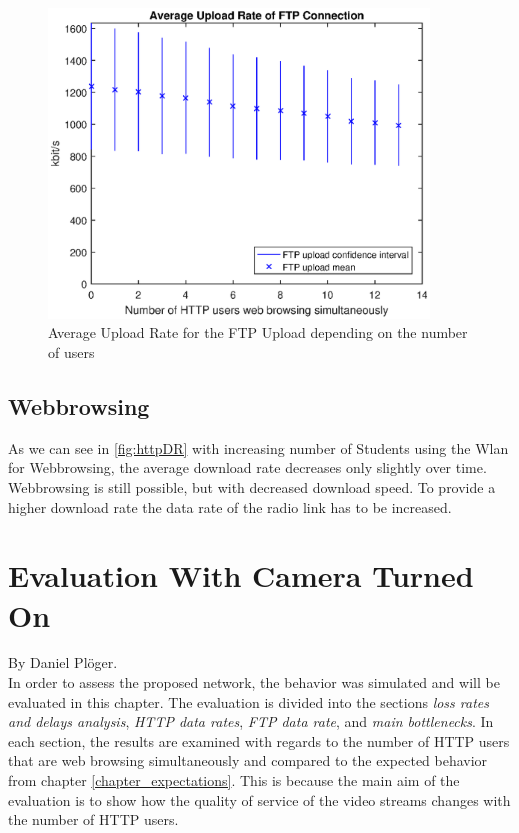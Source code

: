 \documentclass[a4paper,10pt]{book}\usepackage{graphicx}
\begin{document}
\begin{figure}[!ht]
  \begin{center}
    \includegraphics[width=0.9\textwidth]{off_ftp_upload.eps}
    \caption{Average Upload Rate for the FTP Upload depending on the number of users}
    \label{fig:ftpUpR}
    \end{center}
\end{figure}

\section{Webbrowsing}
As we can see in \ref{fig:httpDR} with increasing number of Students using the Wlan for Webbrowsing, the average download rate decreases only slightly over time. Webbrowsing is still possible, but with decreased download speed.
To provide a higher download rate the data rate of the radio link has to be increased. 



\chapter{Evaluation With Camera Turned On}
By Daniel Plöger.\\

In order to assess the proposed network, the behavior was simulated and will be evaluated in this chapter. The evaluation is divided into the sections \textit{loss rates and delays analysis}, \textit{HTTP data rates}, \textit{FTP data rate}, and \textit{main bottlenecks}. In each section, the results are examined with regards to the number of HTTP users that are web browsing simultaneously and compared to the expected behavior from chapter \ref{chapter_expectations}. This is because the main aim of the evaluation is to show how the quality of service of the video streams changes with the number of HTTP users. 
\end{document}
